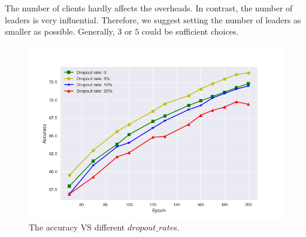 The number of clients hardly affects the overheads. In contrast, the number of leaders is very influential. Therefore, we suggest setting the number of leaders as smaller as possible. Generally, $3$ or $5$ could be sufficient choices.

\begin{figure}[!ht]
    \centering
    \includegraphics[width=\columnwidth]{img/dropout-acc.png}
    \caption{The accuracy VS different $dropout\_rate$s.}
    \label{dropout-acc}
\end{figure}

